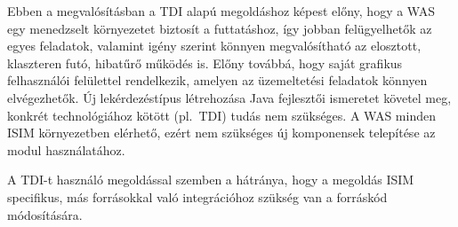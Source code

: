 Ebben a megvalósításban a TDI alapú megoldáshoz képest előny, hogy a WAS egy menedzselt környezetet biztosít a futtatáshoz, így jobban felügyelhetők az egyes feladatok, valamint igény szerint könnyen megvalósítható az elosztott, klaszteren futó, hibatűrő működés is. Előny továbbá, hogy saját grafikus felhasználói felülettel rendelkezik, amelyen az üzemeltetési feladatok könnyen elvégezhetők. Új lekérdezéstípus létrehozása Java fejlesztői ismeretet követel meg, konkrét technológiához kötött (pl.~TDI) tudás nem szükséges. A WAS minden ISIM környezetben elérhető, ezért nem szükséges új komponensek telepítése az modul használatához.

A TDI-t használó megoldással szemben a hátránya, hogy a megoldás ISIM specifikus, más forrásokkal való integrációhoz szükség van a forráskód módosítására.




